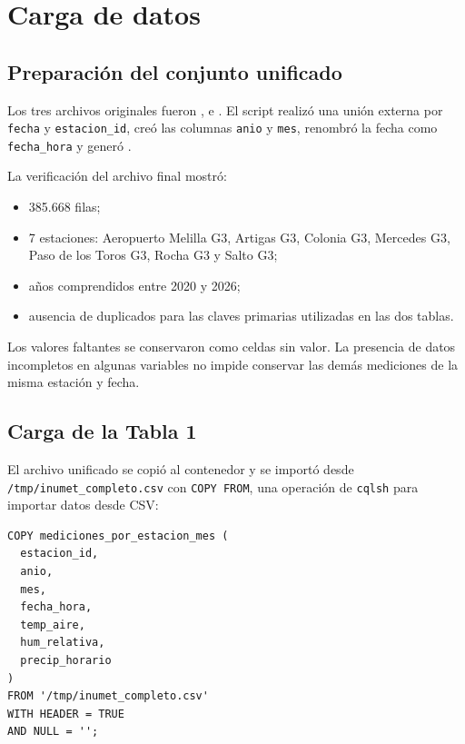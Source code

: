 \section{Carga de datos}

\subsection{Preparación del conjunto unificado}

Los tres archivos originales fueron ,  e . El script  realizó una unión externa por \texttt{fecha} y \texttt{estacion\_id}, creó las columnas \texttt{anio} y \texttt{mes}, renombró la fecha como \texttt{fecha\_hora} y generó .

La verificación del archivo final mostró:
\begin{itemize}
    \item 385.668 filas;
    \item 7 estaciones: Aeropuerto Melilla G3, Artigas G3, Colonia G3, Mercedes G3, Paso de los Toros G3, Rocha G3 y Salto G3;
    \item años comprendidos entre 2020 y 2026;
    \item ausencia de duplicados para las claves primarias utilizadas en las dos tablas.
\end{itemize}

Los valores faltantes se conservaron como celdas sin valor. La presencia de datos incompletos en algunas variables no impide conservar las demás mediciones de la misma estación y fecha.

\subsection{Carga de la Tabla 1}

El archivo unificado se copió al contenedor y se importó desde \texttt{/tmp/inumet\_completo.csv} con \texttt{COPY FROM}, una operación de \texttt{cqlsh} para importar datos desde CSV:

\begin{lstlisting}[language=CQL]
COPY mediciones_por_estacion_mes (
  estacion_id,
  anio,
  mes,
  fecha_hora,
  temp_aire,
  hum_relativa,
  precip_horario
)
FROM '/tmp/inumet_completo.csv'
WITH HEADER = TRUE
AND NULL = '';
\end{lstlisting}

